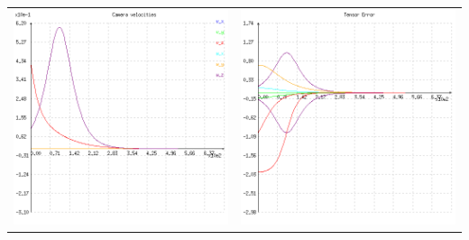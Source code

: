 {\begin{center}
\begin{tabular}{cc}
  \includegraphics[height=0.15\textheight]{figures/plots/ex4cvelocity.png}&
  \includegraphics[height=0.15\textheight]{figures/plots/ex4cerror.png}\\
  \end{tabular}
\end{center}
\vfill
}
